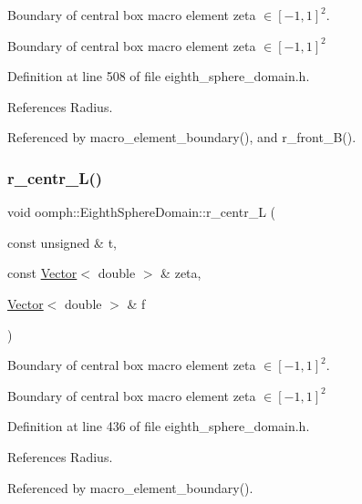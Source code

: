 Boundary of central box macro element zeta $ \in [-1,1]^2 $. 

Boundary of central box macro element zeta $ \in [-1,1]^2 $ 

Definition at line 508 of file eighth\+\_\+sphere\+\_\+domain.\+h.



References Radius.



Referenced by macro\+\_\+element\+\_\+boundary(), and r\+\_\+front\+\_\+\+B().

\mbox{\label{classoomph_1_1EighthSphereDomain_adc5634bf44b0689994ad68daf203e11f}} 
\subsubsection{\texorpdfstring{r\+\_\+centr\+\_\+\+L()}{r\_centr\_L()}}
{\footnotesize\ttfamily void oomph\+::\+Eighth\+Sphere\+Domain\+::r\+\_\+centr\+\_\+L (\begin{DoxyParamCaption}\item[{const unsigned \&}]{t,  }\item[{const \hyperlink{classoomph_1_1Vector}{Vector}$<$ double $>$ \&}]{zeta,  }\item[{\hyperlink{classoomph_1_1Vector}{Vector}$<$ double $>$ \&}]{f }\end{DoxyParamCaption})\hspace{0.3cm}{\ttfamily [private]}}



Boundary of central box macro element zeta $ \in [-1,1]^2 $. 

Boundary of central box macro element zeta $ \in [-1,1]^2 $ 

Definition at line 436 of file eighth\+\_\+sphere\+\_\+domain.\+h.



References Radius.



Referenced by macro\+\_\+element\+\_\+boundary().

\mbox{\label{classoomph_1_1EighthSphereDomain_a226c7c3bbcc59aa73c1033af523ef653}} 
